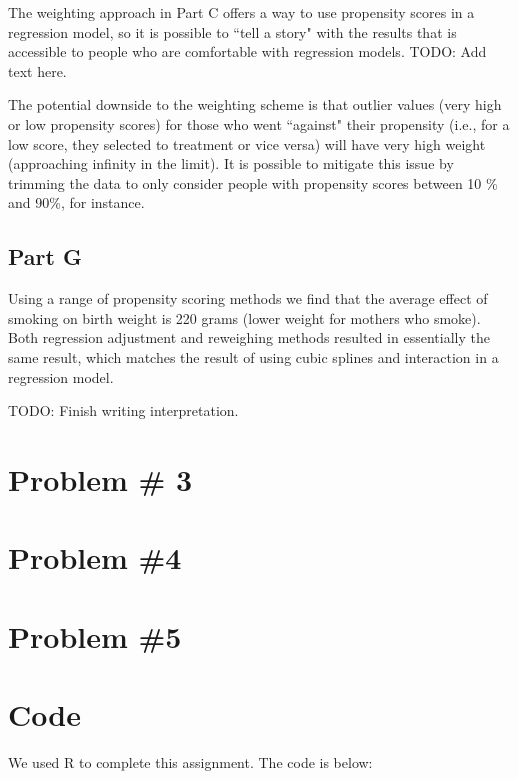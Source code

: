 \documentclass[letterpaper, 12pt]{article}
\begin{document}
The weighting approach in Part C offers a way to use propensity scores in a regression model, so it is possible to ``tell a story" with the results that is accessible to people who are comfortable with regression models.  TODO: Add text here. 

The potential downside to the weighting scheme is that outlier values (very high or low propensity scores) for those who went ``against" their propensity (i.e., for a low score, they selected to treatment or vice versa) will have very high weight (approaching infinity in the limit).  It is possible to mitigate this issue by trimming the data to only consider people with propensity scores between 10 \% and 90\%, for instance.  

\subsection{Part G}
Using a range of propensity scoring methods we find that the average effect of smoking on birth weight is 220 grams (lower weight for mothers who smoke).  Both regression adjustment and reweighing methods resulted in essentially the same result, which matches the result of using cubic splines and interaction in a regression model.  

TODO: Finish writing interpretation.
\section{Problem \# 3}

\section{Problem \#4}

\section{Problem \#5}


\section{Code}
We used R to complete this assignment.  The code is below:




\newpage
\thispagestyle{empty}
\mbox{}
\end{document}
